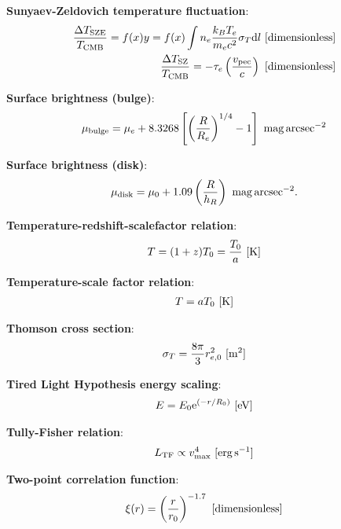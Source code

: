 \documentclass[a4paper,11pt]{article}
\begin{document}
{\noindent}\textbf{Sunyaev-Zeldovich temperature fluctuation}:
\begin{align*}
    \frac{\Delta T_\mathrm{SZE}}{T_\mathrm{CMB}} = f(x)y = f(x)\int n_e\frac{k_BT_e}{m_ec^2}\sigma_T \mathrm{d}l ~ [{\rm dimensionless}] \\
    \frac{\Delta T_\mathrm{SZ}}{T_\mathrm{CMB}} = -\tau_e \left(\frac{v_\mathrm{pec}}{c}\right) ~ [{\rm dimensionless}]
\end{align*}

{\noindent}\textbf{Surface brightness (bulge)}:
\begin{align*}
    \mu_\mathrm{bulge} = \mu_e + 8.3268\left[\left(\frac{R}{R_e}\right)^{1/4}-1\right] ~ {\rm mag\,arcsec^{-2}}
\end{align*}

{\noindent}\textbf{Surface brightness (disk)}:
\begin{align*}
    \mu_\mathrm{disk} = \mu_0 + 1.09\left(\frac{R}{h_R}\right) ~ {\rm mag\,arcsec^{-2}}.
\end{align*}

{\noindent}\textbf{Temperature-redshift-scalefactor relation}:
\begin{align*}
    T = (1+z)T_0 = \frac{T_0}{a} ~ [{\rm K}]
\end{align*}

{\noindent}\textbf{Temperature-scale factor relation}:
\begin{align*}
    T = aT_0 ~ [{\rm K}]
\end{align*}

{\noindent}\textbf{Thomson cross section}:
\begin{align*}
\sigma_T = \frac{8\pi}{3}r_{e,0}^2 ~ [{\rm m^2}]
\end{align*}

{\noindent}\textbf{Tired Light Hypothesis energy scaling}:
\begin{align*}
    E = E_0 \mathrm{e}^{(-r/R_0)} ~ [{\rm eV}]
\end{align*}

{\noindent}\textbf{Tully-Fisher relation}:
\begin{align*}
    L_\mathrm{TF} \propto v_\mathrm{max}^4 ~ [{\rm erg\,s^{-1}}]
\end{align*}

{\noindent}\textbf{Two-point correlation function}:
\begin{align*}
    \xi(r) = \left(\frac{r}{r_0}\right)^{-1.7} ~ [{\rm dimensionless}] 
\end{align*}
\end{document}
